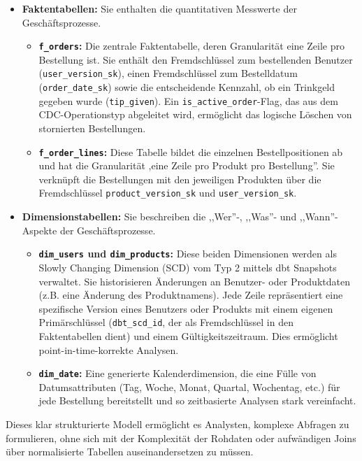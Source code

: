 \documentclass[
    12pt,               
    a4paper,        
    ngerman            
]{scrartcl}
\begin{document}
\begin{itemize}
    \item \textbf{Faktentabellen:} Sie enthalten die quantitativen Messwerte der Geschäftsprozesse.
    \begin{itemize}
        \item \textbf{\texttt{f\_orders}:} Die zentrale Faktentabelle, deren Granularität eine Zeile pro Bestellung ist. Sie enthält den Fremdschlüssel zum bestellenden Benutzer (\texttt{user\_version\_sk}), einen Fremdschlüssel zum Bestelldatum (\texttt{order\_date\_sk}) sowie die entscheidende Kennzahl, ob ein Trinkgeld gegeben wurde (\texttt{tip\_given}). Ein \texttt{is\_active\_order}-Flag, das aus dem CDC-Operationstyp abgeleitet wird, ermöglicht das logische Löschen von stornierten Bestellungen.
        \item \textbf{\texttt{f\_order\_lines}:} Diese Tabelle bildet die einzelnen Bestellpositionen ab und hat die Granularität ,eine Zeile pro Produkt pro Bestellung''. Sie verknüpft die Bestellungen mit den jeweiligen Produkten über die Fremdschlüssel \texttt{product\_version\_sk} und \texttt{user\_version\_sk}.
    \end{itemize}

    \item \textbf{Dimensionstabellen:} Sie beschreiben die ,,Wer''-, ,,Was''- und ,,Wann''-Aspekte der Geschäftsprozesse.
    \begin{itemize}
        \item \textbf{\texttt{dim\_users} und \texttt{dim\_products}:} Diese beiden Dimensionen werden als Slowly Changing Dimension (SCD) vom Typ 2 mittels dbt Snapshots verwaltet. Sie historisieren Änderungen an Benutzer- oder Produktdaten (z.B. eine Änderung des Produktnamens). Jede Zeile repräsentiert eine spezifische Version eines Benutzers oder Produkts mit einem eigenen Primärschlüssel (\texttt{dbt\_scd\_id}, der als Fremdschlüssel in den Faktentabellen dient) und einem Gültigkeitszeitraum. Dies ermöglicht point-in-time-korrekte Analysen.
        \item \textbf{\texttt{dim\_date}:} Eine generierte Kalenderdimension, die eine Fülle von Datumsattributen (Tag, Woche, Monat, Quartal, Wochentag, etc.) für jede Bestellung bereitstellt und so zeitbasierte Analysen stark vereinfacht.
    \end{itemize}
\end{itemize}

Dieses klar strukturierte Modell ermöglicht es Analysten, komplexe Abfragen zu formulieren, ohne sich mit der Komplexität der Rohdaten oder aufwändigen Joins über normalisierte Tabellen auseinandersetzen zu müssen.
\end{document}

